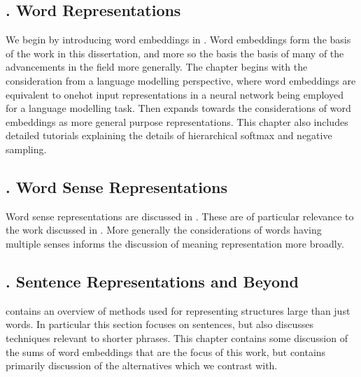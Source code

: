 \documentclass{book}
\begin{document}
\subsection*{.  Word Representations}
We begin by introducing word embeddings in .
Word embeddings form the basis of the work in this dissertation, and more so the basis the basis of many of the advancements in the field more generally.
The chapter begins with the consideration from a language modelling perspective,
where word embeddings are equivalent to onehot input representations in a neural network being employed for a language modelling task.
Then expands towards the considerations of word embeddings as more general purpose representations.
This chapter also includes detailed tutorials explaining the details of hierarchical softmax and negative sampling.


\subsection*{.  Word Sense Representations}
Word sense representations are discussed in .
These are of particular relevance to the work discussed in .
More generally the considerations of words having multiple senses informs the discussion of meaning representation more broadly.

\subsection*{.  Sentence Representations and Beyond}
 contains an overview of methods used for representing structures large than just words.
In particular this section focuses on sentences, but also discusses techniques relevant to shorter phrases.
This chapter contains some discussion of the sums of word embeddings that are the focus of this work,
but contains primarily discussion of the alternatives which we contrast with.
\end{document}
